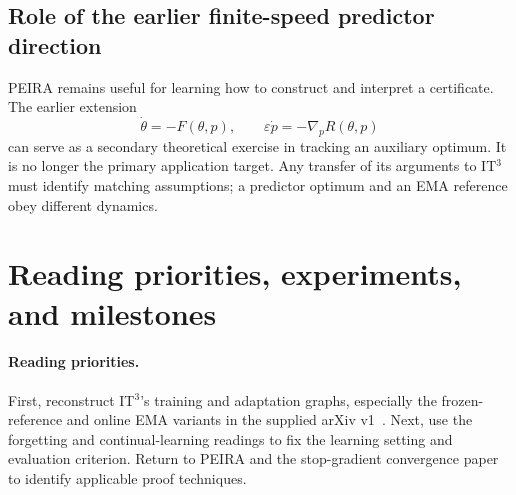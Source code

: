 \documentclass[11pt,a4paper]{article}
\newif\ifdraftnotes
\newcommand{\draftnote}[1]{\ifdraftnotes\par\smallskip
  {\small\color{gray}\noindent\textit{To develop:} #1\par}\smallskip\fi}
\begin{document}
\subsection{Role of the earlier finite-speed predictor direction}
PEIRA remains useful for learning how to construct and interpret a
certificate. The earlier extension
\[
 \dot\theta=-F(\theta,p),\qquad
 \varepsilon\dot p=-\nabla_p R(\theta,p)
\]
can serve as a secondary theoretical exercise in tracking an auxiliary
optimum. It is no longer the primary application target. Any transfer of
its arguments to IT$^3$ must identify matching assumptions; a predictor
optimum and an EMA reference obey different dynamics.

\section{Reading priorities, experiments, and milestones}
\label{sec:plan}
\paragraph{Reading priorities.}
First, reconstruct IT$^3$'s training and adaptation graphs, especially the
frozen-reference and online EMA variants in the supplied arXiv
v1~\cite{it3}. Next, use the forgetting and continual-learning readings to
fix the learning setting and evaluation criterion. Return to PEIRA and
the stop-gradient convergence paper to identify applicable proof techniques.
\draftnote{Identify the exact forgetting and continual-learning position
papers in the reading discussion before adding bibliographic claims.
Read the supplied stop-gradient convergence and LyapuFlow papers for their
precise assumptions; a feedback certificate for a generative flow is not
automatically a training-dynamics certificate.}
\end{document}
